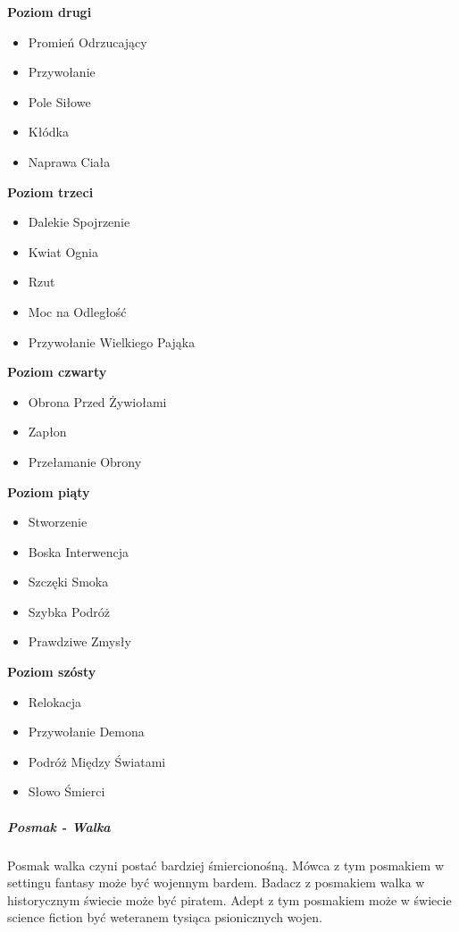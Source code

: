 \textbf{Poziom drugi}
\begin{itemize}
\item Promień Odrzucający
\item Przywołanie
\item Pole Siłowe
\item Kłódka
\item Naprawa Ciała
\end{itemize}

\textbf{Poziom trzeci}
\begin{itemize}
\item Dalekie Spojrzenie
\item Kwiat Ognia
\item Rzut
\item Moc na Odległość
\item Przywołanie Wielkiego Pająka
\end{itemize}

\textbf{Poziom czwarty}
\begin{itemize}
\item Obrona Przed Żywiołami
\item Zapłon
\item Przełamanie Obrony
\end{itemize}

\textbf{Poziom piąty}
\begin{itemize}
\item Stworzenie
\item Boska Interwencja
\item Szczęki Smoka
\item Szybka Podróż
\item Prawdziwe Zmysły
\end{itemize}

\textbf{Poziom szósty}
\begin{itemize}
\item Relokacja
\item Przywołanie Demona
\item Podróż Między Światami
\item Słowo Śmierci
\end{itemize}

\subparagraph{Posmak - Walka}

Posmak walka czyni postać bardziej śmiercionośną. Mówca z tym posmakiem w settingu fantasy może być wojennym bardem. Badacz z posmakiem walka w historycznym świecie może być piratem. Adept z tym posmakiem może w świecie science fiction być weteranem tysiąca psionicznych wojen.


